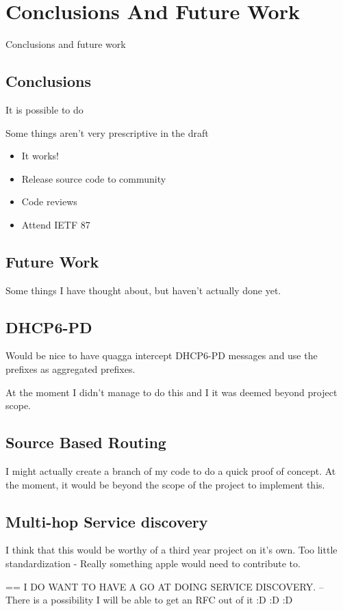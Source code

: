 \documentclass[12pt]{report}
\begin{document}
\chapter{Conclusions And Future Work}
Conclusions and future work

\section{Conclusions}

It is possible to do

Some things aren't very prescriptive in the draft

\begin{itemize}
\item It works! 
\item Release source code to community
\item Code reviews
\item Attend IETF 87
\end{itemize}

\section{Future Work}
Some things I have thought about, but haven't actually done yet.

\section{DHCP6-PD}
Would be nice to have quagga intercept DHCP6-PD messages and use the prefixes as aggregated prefixes. 

At the moment I didn't manage to do this and I it was deemed beyond project scope.

\section{Source Based Routing}
I might actually create a branch of my code to do a quick proof of concept. At the moment, 
it would be beyond the scope of the project to implement this. 

\section{Multi-hop Service discovery}
I think that this would be worthy of a third year project on it's own. 
Too little standardization - Really something apple would need to contribute to. 

== I DO WANT TO HAVE A GO AT DOING SERVICE DISCOVERY.
-- There is a possibility I will be able to get an RFC out of it :D :D :D
\end{document}
